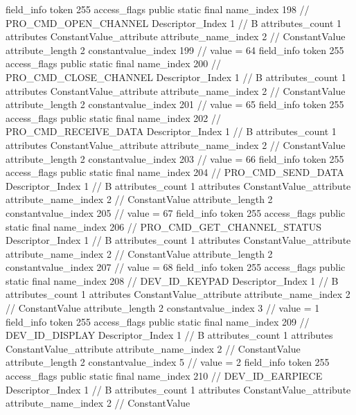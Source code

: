 {{{{{{{				}
				}
			}
			field_info {
				token	255
				access_flags	public static final
				name_index	198		// PRO_CMD_OPEN_CHANNEL
				Descriptor_Index	1		// B
				attributes_count	1
				attributes {
				ConstantValue_attribute {
					attribute_name_index	2		// ConstantValue
					attribute_length	2
					constantvalue_index	199		// value = 64
				}
				}
			}
			field_info {
				token	255
				access_flags	public static final
				name_index	200		// PRO_CMD_CLOSE_CHANNEL
				Descriptor_Index	1		// B
				attributes_count	1
				attributes {
				ConstantValue_attribute {
					attribute_name_index	2		// ConstantValue
					attribute_length	2
					constantvalue_index	201		// value = 65
				}
				}
			}
			field_info {
				token	255
				access_flags	public static final
				name_index	202		// PRO_CMD_RECEIVE_DATA
				Descriptor_Index	1		// B
				attributes_count	1
				attributes {
				ConstantValue_attribute {
					attribute_name_index	2		// ConstantValue
					attribute_length	2
					constantvalue_index	203		// value = 66
				}
				}
			}
			field_info {
				token	255
				access_flags	public static final
				name_index	204		// PRO_CMD_SEND_DATA
				Descriptor_Index	1		// B
				attributes_count	1
				attributes {
				ConstantValue_attribute {
					attribute_name_index	2		// ConstantValue
					attribute_length	2
					constantvalue_index	205		// value = 67
				}
				}
			}
			field_info {
				token	255
				access_flags	public static final
				name_index	206		// PRO_CMD_GET_CHANNEL_STATUS
				Descriptor_Index	1		// B
				attributes_count	1
				attributes {
				ConstantValue_attribute {
					attribute_name_index	2		// ConstantValue
					attribute_length	2
					constantvalue_index	207		// value = 68
				}
				}
			}
			field_info {
				token	255
				access_flags	public static final
				name_index	208		// DEV_ID_KEYPAD
				Descriptor_Index	1		// B
				attributes_count	1
				attributes {
				ConstantValue_attribute {
					attribute_name_index	2		// ConstantValue
					attribute_length	2
					constantvalue_index	3		// value = 1
				}
				}
			}
			field_info {
				token	255
				access_flags	public static final
				name_index	209		// DEV_ID_DISPLAY
				Descriptor_Index	1		// B
				attributes_count	1
				attributes {
				ConstantValue_attribute {
					attribute_name_index	2		// ConstantValue
					attribute_length	2
					constantvalue_index	5		// value = 2
				}
				}
			}
			field_info {
				token	255
				access_flags	public static final
				name_index	210		// DEV_ID_EARPIECE
				Descriptor_Index	1		// B
				attributes_count	1
				attributes {
				ConstantValue_attribute {
					attribute_name_index	2		// ConstantValue
}}}}}}}
